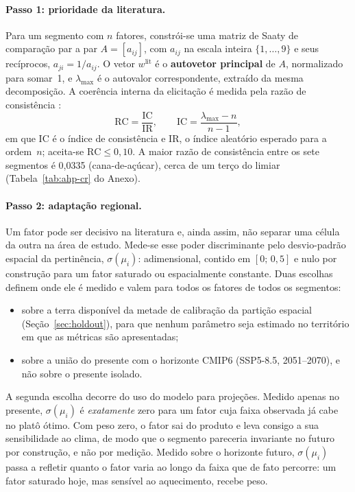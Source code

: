 \paragraph{Passo 1: prioridade da literatura.}
Para um segmento com $n$ fatores, constrói-se uma matriz de Saaty de comparação par a par
$A = [a_{ij}]$, com $a_{ij}$ na escala inteira $\{1,\dots,9\}$ e seus recíprocos, $a_{ji} =
1/a_{ij}$. O vetor $w^{\mathrm{lit}}$ é o \textbf{autovetor principal} de $A$, normalizado para
somar~1, e $\lambda_{\max}$ é o autovalor correspondente, extraído da mesma decomposição. A
coerência interna da elicitação é medida pela razão de consistência
\citep[p.~171]{saaty_analytic_1987}:
\begin{equation*}
  \mathrm{RC} = \frac{\mathrm{IC}}{\mathrm{IR}}, \qquad
   \mathrm{IC} = \frac{\lambda_{\max} - n}{n - 1},
\end{equation*}
em que $\mathrm{IC}$ é o índice de consistência e $\mathrm{IR}$, o índice aleatório esperado para a
ordem~$n$; aceita-se $\mathrm{RC} \le 0{,}10$. A maior razão de consistência entre os sete segmentos
é 0,0335 (cana-de-açúcar), cerca de um terço do limiar (Tabela~\ref{tab:ahp-cr} do Anexo).

\paragraph{Passo 2: adaptação regional.}
Um fator pode ser decisivo na literatura e, ainda assim, não separar uma célula da outra na área de
estudo. Mede-se esse poder discriminante pelo desvio-padrão espacial da pertinência,
$\sigma(\mu_i)$: adimensional, contido em $[0;\,0{,}5]$ e nulo por construção para um fator
saturado ou espacialmente constante. Duas escolhas definem onde ele é medido e valem para todos
os fatores de todos os segmentos:

\begin{itemize}
  \item sobre a terra disponível da metade de calibração da partição espacial
    (Seção~\ref{sec:holdout}), para que nenhum parâmetro seja estimado no território em que as
    métricas são apresentadas;
  \item sobre a união do presente com o horizonte CMIP6 (SSP5-8.5, 2051--2070), e não
    sobre o presente isolado.
\end{itemize}

A segunda escolha decorre do uso do modelo para projeções. Medido apenas no presente, $\sigma(\mu_i)$
é \emph{exatamente} zero para um fator cuja faixa observada já cabe no platô ótimo. Com peso zero, o
fator sai do produto e leva consigo a sua sensibilidade ao clima, de modo que o segmento pareceria
invariante no futuro por construção, e não por medição. Medido sobre o horizonte futuro,
$\sigma(\mu_i)$ passa a refletir quanto o fator varia ao longo da faixa que de fato percorre: um fator
saturado hoje, mas sensível ao aquecimento, recebe peso.

